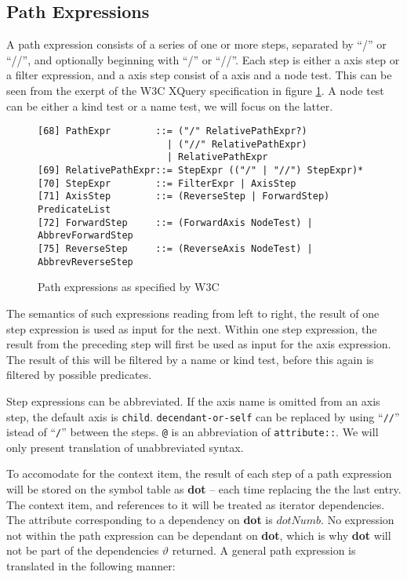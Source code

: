 \subsection{Path Expressions}
\label{sect:trans:TD:pathExprs}
A path expression consists of a series of one or more steps, separated by ``/'' or ``//'', and optionally beginning
with ``/'' or ``//''.  Each step is either a axis step or a filter expression, and a axis step consist of a axis
and a node test. This can be seen from the exerpt of the W3C XQuery specification in figure \ref{fig:trans:TD:pathEBNF}.
A node test can be either a kind test or a name test, we will focus on the latter. 

\begin{figure}[h]
\begin{Verbatim}
[68] PathExpr        ::= ("/" RelativePathExpr?)
                       | ("//" RelativePathExpr)
                       | RelativePathExpr
[69] RelativePathExpr::= StepExpr (("/" | "//") StepExpr)*
[70] StepExpr        ::= FilterExpr | AxisStep
[71] AxisStep        ::= (ReverseStep | ForwardStep) PredicateList
[72] ForwardStep     ::= (ForwardAxis NodeTest) | AbbrevForwardStep
[75] ReverseStep     ::= (ReverseAxis NodeTest) | AbbrevReverseStep
\end{Verbatim}
\label{fig:trans:TD:pathEBNF}
\caption{Path expressions as specified by W3C}
\end{figure}
The semantics of such expressions reading from left to right, the result of one step expression is used as input
for the next. Within one step expression, the result from the preceding step will first be used as input for the
axis expression. The result of this will be filtered by a name or kind test, before this again is filtered by
possible predicates.

Step expressions can be abbreviated. If the axis name is omitted from an axis step, the default axis is
\texttt{child}. \texttt{decendant-or-self} can be replaced by using ``\texttt{//}'' istead of ``\texttt{/}''
between the steps. \texttt{@} is an abbreviation of \texttt{attribute::}. We will only present translation of
unabbreviated syntax.

To accomodate for the context item, the result of each step of a path expression will be stored on the symbol
table as \textbf{dot} -- each time replacing the the last entry. The context item, and references to it will be
treated as iterator dependencies. The attribute corresponding to a dependency on \textbf{dot} is $dotNumb$. No
expression not within the path expression can be dependant on \textbf{dot}, which is why \textbf{dot} will not be
part of the dependencies $\vartheta$ returned. A general path expression is translated in the following manner:

